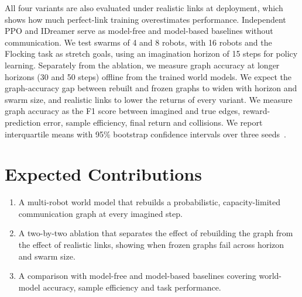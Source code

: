 \documentclass[conference]{IEEEtran}
\begin{document}
All four variants are also evaluated under realistic links at deployment, which shows how much perfect-link training overestimates performance. Independent PPO and IDreamer serve as model-free and model-based baselines without communication. We test swarms of 4 and 8 robots, with 16 robots and the Flocking task as stretch goals, using an imagination horizon of 15 steps for policy learning. Separately from the ablation, we measure graph accuracy at longer horizons (30 and 50 steps) offline from the trained world models. We expect the graph-accuracy gap between rebuilt and frozen graphs to widen with horizon and swarm size, and realistic links to lower the returns of every variant. We measure graph accuracy as the F1 score between imagined and true edges, reward-prediction error, sample efficiency, final return and collisions. We report interquartile means with 95\% bootstrap confidence intervals over three seeds~\cite{agarwal2021precipice}.

\section{Expected Contributions}
\begin{enumerate}
\item A multi-robot world model that rebuilds a probabilistic, capacity-limited communication graph at every imagined step.
\item A two-by-two ablation that separates the effect of rebuilding the graph from the effect of realistic links, showing when frozen graphs fail across horizon and swarm size.
\item A comparison with model-free and model-based baselines covering world-model accuracy, sample efficiency and task performance.
\end{enumerate}
\end{document}

